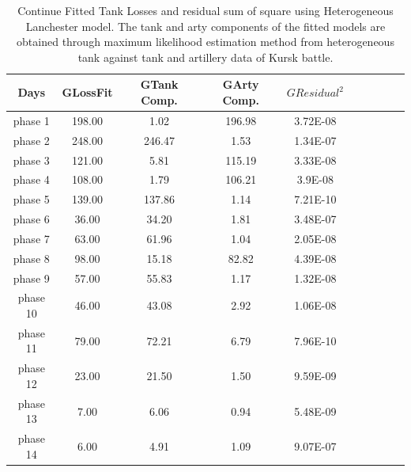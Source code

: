 \documentclass[]{article}
\begin{document}
\begin{table}
\centering
\tiny
\caption{Continue Fitted Tank Losses and residual sum of square using Heterogeneous Lanchester model. The tank and arty components of the fitted models are obtained through maximum likelihood estimation method from heterogeneous tank against tank and artillery data of Kursk battle.}
{\begin{tabular}{|c|c|c|c|c|c|c|c|c|c|}   \hline\hline
Days & GLossFit	&GTank Comp.	&GArty Comp.	& $GResidual^2$ \\
\hline
\hline
phase 1&		198.00&	1.02&	196.98&	3.72E-08\\\hline
phase 2	&	248.00&	246.47&	1.53&	1.34E-07\\\hline
phase 3	&	121.00&	5.81	&115.19	&3.33E-08\\\hline
phase 4	&	108.00&	1.79&	106.21&	3.9E-08\\\hline
phase 5	&	139.00&	137.86	&1.14&	7.21E-10\\\hline
phase 6	&	36.00	&34.20&	1.81&	3.48E-07\\\hline
phase 7	&	63.00	&61.96	&1.04&	2.05E-08\\\hline
phase 8	&	98.00	&15.18&	82.82	&4.39E-08\\\hline
phase 9	&	57.00	&55.83&	1.17	&1.32E-08\\\hline
phase 10&	46.00	&43.08&	2.92&	1.06E-08\\\hline
phase 11&	79.00	&72.21	&6.79&	7.96E-10\\\hline
phase 12&	23.00&	21.50&	1.50&	9.59E-09\\\hline
phase 13&	7.00&	6.06	&0.94	&5.48E-09\\\hline
phase 14&	6.00&	4.91&	1.09&	9.07E-07\\\hline

\hline

\end{tabular}}\label{landtab}
\end{table}
\end{document}
